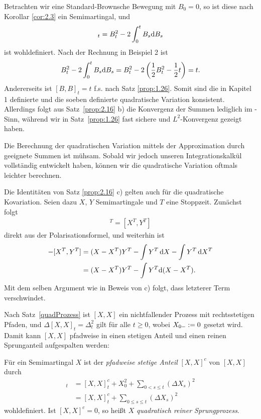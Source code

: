 \begin{rem*}[Bemerkungen.]
\begin{remenum}
\item
Betrachten wir eine Standard-Brownsche Bewegung mit $B_0 = 0$, so ist diese
nach Korollar \ref{cor:2.3} ein Semimartingal, und
\begin{align*}
[B,B]_t = B_t^2 - 2\int_0^t B_s \dB_s
\end{align*}
ist wohldefiniert. Nach der Rechnung in Beispiel 2 ist
\begin{align*}
B_t^2 - 2\int_0^t B_s \mathrm{d} B_s = B_t^2 - 2\left(\frac{1}{2}B_t^2 - \frac{1}{2}t
\right) = t.
\end{align*}
Andererseits ist $[B,B]_t = t$ f.s. nach Satz \ref{prop:1.26}. Somit sind die
in Kapitel 1 definierte und die soeben definierte quadratische Variation
konsistent. Allerdings folgt aus Satz~\ref{prop:2.16} b) die Konvergenz der
Summen lediglich im \ucp-Sinn, während wir in Satz~\ref{prop:1.26} fast sichere
und $L^2$-Konvergenz gezeigt haben.
\item
Die Berechnung der quadratischen Variation mittels der Approximation durch
geeignete Summen ist mühsam. Sobald wir jedoch unseren Integrationskalkül
vollständig entwickelt haben, können wir die quadratische Variation oftmals
leichter berechnen.

\item Die Identitäten von Satz \ref{prop:2.16} c) gelten auch für die
quadratische Kovariation. Seien dazu $X$, $Y$ Semimartingale und $T$ eine
Stoppzeit. Zunächst folgt
\begin{align*}
[X,Y]^T = [X^T,Y^T] 
\end{align*}
direkt aus der Polarisationsformel, und weiterhin ist
\begin{align*}
[X,Y^T] - [X^T,Y^T] &= (X-X^T)Y^T - \int Y^T\dX - \int Y^T\dX^T\\
&= (X-X^T)Y^T - \int Y^T\diffd(X - X^T).
\end{align*}
Mit dem selben Argument wie in Beweis von c) folgt, dass letzterer Term
verschwindet.\map
\end{remenum}
\end{rem*}


Nach Satz~\ref{quadProzess} ist $[X,X]$ ein nichtfallender Prozess mit
rechtsstetigen Pfaden, und $\Delta[X,X]_t= \Delta_t^2$ gilt für alle $t \ge 0$,
wobei $X_{0-}:= 0$ gesetzt wird. Damit kann $[X,X]$ pfadweise in einen
stetigen Anteil und einen reinen Sprunganteil aufgespalten werden:

\begin{definition}
\label{defn:2.9}
Für ein Semimartingal $X$ ist der \emph{pfadweise stetige Anteil} $[X,X]^c$
  von $[X,X]$ durch
  \begin{align*} [X,X]_t &= [X,X]_t^c + X_0^2 + \sum_{0 < s \le t} (\Delta
    X_s)^2 \\ &= [X,X]_t^c + \sum_{0 \le s \le t} (\Delta X_s)^2
\end{align*}
wohldefiniert. Ist $[X,X]^c=0$, so heißt $X$ \emph{quadratisch reiner
Sprungprozess}.\fish
\end{definition}

